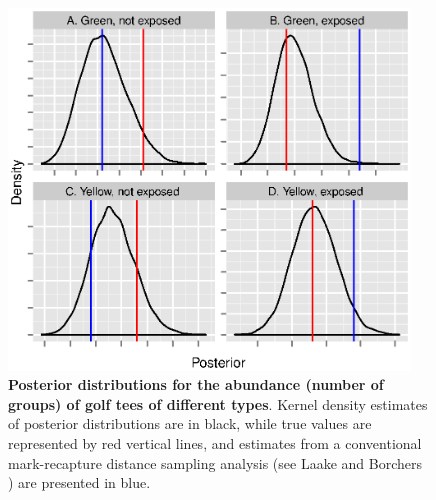 \documentclass[10pt]{article}
\begin{document}
\begin{figure}
\begin{center}
\includegraphics[width=0.95\textwidth]{golf_tee_post_N.eps}
\end{center}
\caption{{\bf Posterior distributions for the abundance (number of groups) of golf tees of different types}. Kernel density estimates of posterior distributions are in black, while true values are represented by red vertical lines, and estimates from a conventional mark-recapture distance sampling analysis (see Laake and Borchers \cite{LaakeBorchers2004}) are presented in blue.}
\label{fig:tee_N}
\end{figure}
\clearpage
\end{document}
